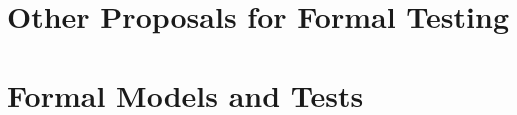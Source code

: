 \documentclass[12pt, a4paper]{report}
\theoremstyle{plain}
\theoremstyle{definition}
\theoremstyle{remark}
\begin{document}
\section{Other Proposals for Formal Testing}






\section{Formal Models and Tests}




\end{document}
